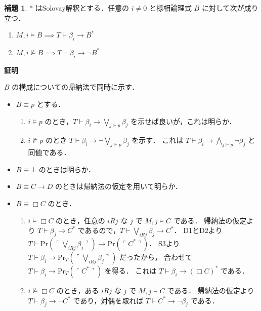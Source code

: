 \documentclass{jsarticle}
\makeatletter
\newcommand*{\Provable}{\mathrm{Pr}}
\theoremstyle{definition}
\newtheorem{lemma}[theorem]{補題}
\renewcommand{\proofname}{証明}
\renewenvironment{proof}[1][\proofname]{\par
    \normalfont 
    \topsep6\p@\@plus6\p@\relax
    \trivlist
    \item\relax
    {\bfseries\gtfamily
    #1\@addpunct{.}}\hspace\labelsep\ignorespaces
    }{%
    \endtrivlist
    \@endpefalse
}
\makeatother
\begin{document}
\begin{lemma}\label{lem:solovay_interpretation}
    $*$ はSolovay解釈とする．任意の $i \neq 0$ と様相論理式 $B$ に対して次が成り立つ．
    \begin{enumerate}
        \item $M, i \vDash B \implies T \vdash \beta_i \to B^*$
        \item $M, i \nvDash B \implies T \vdash \beta_i \to \lnot B^*$
    \end{enumerate}
\end{lemma}
\begin{proof}
    $B$ の構成についての帰納法で同時に示す．
    \begin{itemize}
        \item 
            $B \equiv p$ とする．
            \begin{enumerate}
                \item 
                $i \vDash p$ のとき，$T \vdash \beta_i \to \bigvee_{j \Vdash p} \beta_j $ を示せば良いが，これは明らか．
                \item 
                $i \nvDash p$ のとき $T \vdash \beta_i \to \lnot \bigvee_{j \Vdash p} \beta_j$ を示す．
                これは $T \vdash \beta_i \to \bigwedge_{j \Vdash p} \lnot \beta_j$ と同値である． 
            \end{enumerate}
        \item $B \equiv \bot$ のときは明らか．
        \item $B \equiv C \to D$ のときは帰納法の仮定を用いて明らか．
        \item 
            $B \equiv \Box C$ のとき．
            \begin{enumerate}
                \item 
                $i \vDash \Box C$ のとき，任意の $i R j$ な $j$ で $M, j \vDash C$ である．
                帰納法の仮定より $T \vdash \beta_j \to C^*$ であるので，$T \vdash \bigvee_{i R j} \beta_j \to C^*$．
                D1とD2より $T \vdash \Provable(\ulcorner \bigvee_{i R j} \beta_j \urcorner) \to \Provable(\ulcorner C^* \urcorner)$．
                S3より $T \vdash \beta_i \to \Provable_T(\ulcorner \bigvee_{i R j} \beta_j \urcorner)$ だったから，
                合わせて $T \vdash \beta_i \to \Provable_T(\ulcorner C^* \urcorner)$ を得る．
                これは $T \vdash \beta_i \to (\Box C)^*$ である．
                \item
                $i \nvDash \Box C$ のとき，ある $i R j$ な $j$ で $M, j \vDash C$ である．
                帰納法の仮定より $T \vdash \beta_j \to \lnot C^*$ であり，対偶を取れば $T \vdash C^* \to \lnot \beta_j$ である．

\end{enumerate}
\end{itemize}
\end{proof}
\end{document}
